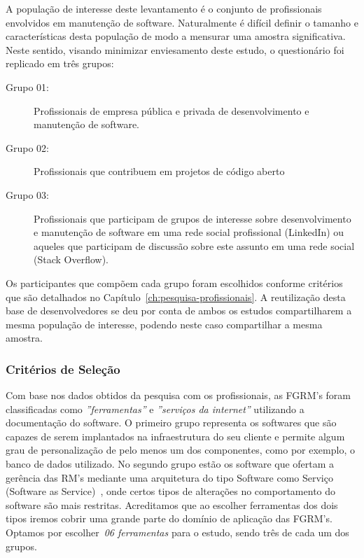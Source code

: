 A população de interesse deste levantamento é o conjunto de profissionais
envolvidos em manutenção de software. Naturalmente é difícil definir o tamanho e
características desta população de modo a mensurar uma amostra significativa.
Neste sentido, visando minimizar enviesamento deste estudo, o questionário
foi replicado em três grupos:

\begin{description}
	\item[Grupo 01:] Profissionais de empresa pública e privada de
			desenvolvimento e manutenção de software.
	\item[Grupo 02:] Profissionais que contribuem em projetos de
		código aberto
	\item[Grupo 03:] Profissionais que participam de grupos de
		interesse sobre desenvolvimento e manutenção de software em uma rede
		social profissional (LinkedIn) ou aqueles que participam de discussão
		sobre este assunto em uma rede social (Stack Overflow).
\end{description}

Os participantes que compõem cada grupo foram escolhidos conforme critérios que
são detalhados no Capítulo~\ref{ch:pesquisa-profissionais}. A reutilização desta
base de desenvolvedores se deu por conta de ambos os estudos compartilharem a
mesma população de interesse, podendo neste caso compartilhar a mesma amostra.

\subsubsection{Critérios de Seleção}
\label{ssub:metodologia_criterios_selecao}

Com base nos dados obtidos da pesquisa com os profissionais, as FGRM's foram
classificadas como \textit{''ferramentas''} e \textit{''serviços da internet''}
utilizando a documentação do software. O primeiro grupo representa os softwares
que são capazes de serem implantados na infraestrutura do seu cliente e permite
algum grau de personalização de pelo menos um dos componentes, como por exemplo,
o banco de dados utilizado. No segundo grupo estão os software que ofertam a
gerência das RM's mediante uma arquitetura do tipo Software como Serviço
(Software as Service)~\cite{fox2013engineering}, onde certos tipos de alterações
no comportamento do software são mais restritas. Acreditamos que ao escolher
ferramentas dos dois tipos iremos cobrir uma grande parte do domínio de
aplicação das FGRM's. Optamos por escolher~\textit{06 ferramentas} para o
estudo, sendo três de cada um dos grupos.

